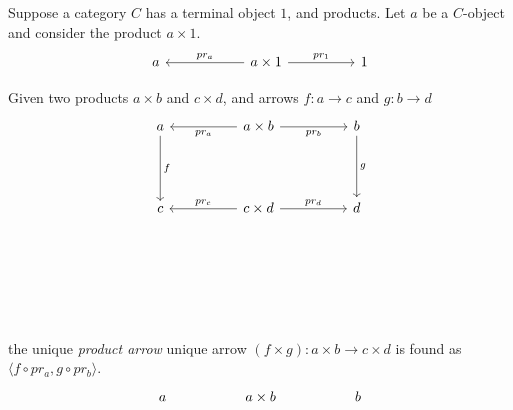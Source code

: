 \documentclass[12pt]{article}
\begin{document}
    \begin{exercise}
        Suppose a category $C$ has a terminal object $1$, and products. Let $a$ be a $C$-object and consider the product $a \times 1$.
        \[\begin{tikzcd}
            {a} & {} & {a \times 1} && {1}
            \arrow["{pr_a}"', from=1-3, to=1-1]
            \arrow["{pr_1}", from=1-3, to=1-5]
        \end{tikzcd}\]
    \end{exercise}

    \begin{defi}
        Given two products $a \times b$ and $c \times d$, and arrows $f : a \to c$ and $g : b \to d$
        \[\begin{tikzcd}
            {a} && {a \times b} && {b} \\
            && {} \\
            {c} && {c \times d} && {d} \\
            \\
            \\
            \\
            && {}
            \arrow["{f}", from=1-1, to=3-1]
            \arrow["{g}", from=1-5, to=3-5]
            \arrow["{pr_a}", from=1-3, to=1-1]
            \arrow["{pr_b}"', from=1-3, to=1-5]
            \arrow["{pr_c}"', from=3-3, to=3-1]
            \arrow["{pr_d}", from=3-3, to=3-5]
        \end{tikzcd}\]
        the unique \emph{product arrow} unique arrow $(f \times g) : a \times b \to c \times d$ is found as $\langle f \circ pr_a, g \circ pr_b \rangle$.
        \[\begin{tikzcd}
            {a} && {a \times b} && {b} \\
            && {} \\

\end{tikzcd}\]
\end{defi}
\end{document}
